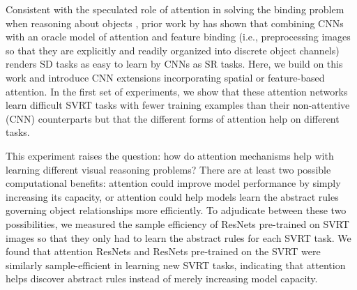 Consistent with the speculated role of attention in solving the binding problem when reasoning about objects \citep{egly1994covert,roelfsema1998object}, prior work by \citet{kim2018not} has shown that combining CNNs with an oracle model of attention and feature binding (i.e., preprocessing images so that they are explicitly and readily organized into discrete object channels) renders SD tasks as easy to learn by CNNs as SR tasks. Here, we build on this work and introduce CNN extensions incorporating spatial or feature-based attention.  In the first set of experiments, we show that these attention networks learn difficult SVRT tasks with fewer training examples than their \textcolor{black}{non}-attentive (CNN) counterparts but that the different forms of attention help on different tasks.


This experiment raises the question: how do attention mechanisms help with learning different visual reasoning problems? There are at least two possible computational benefits: attention could improve model performance by simply increasing its capacity, or attention could help models learn the abstract rules governing object relationships more efficiently. To adjudicate between these two possibilities, we measured the sample efficiency of ResNets pre-trained on SVRT images so that they only had to learn the abstract rules for each SVRT task. We found that attention ResNets and ResNets pre-trained on the SVRT were similarly sample-efficient in learning new SVRT tasks, indicating that attention helps discover abstract rules instead of merely increasing model capacity.


